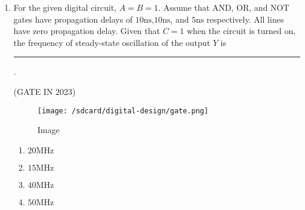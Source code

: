 \documentclass[12pt]{article}
\begin{document}
\begin{enumerate}
\item For the given digital circuit, $A = B = 1$. Assume that AND, OR, and NOT gates have propagation delays of $10\mathrm{ns}$,$10\mathrm{ns}$, and $5\mathrm{ns}$ respectively. All lines have zero
propagation delay. Given that $C = 1$ when the circuit is turned on, the frequency of steady-state oscillation of the output $Y$  is  \rule{30pt}{1pt}.

\hfill (GATE IN 2023)
\begin{figure}[!ht]
        \centering  
        
        \texttt{[image: /sdcard/digital-design/gate.png]}
        \caption{Image}
        
\end{figure}
    \begin{enumerate}
        \item $20 \mathrm{MHz}$
        \item $15 \mathrm{MHz}$
        \item $40 \mathrm{MHz}$
        \item $50 \mathrm{MHz}$
    \end{enumerate}
  \end{enumerate}
\end{document}
